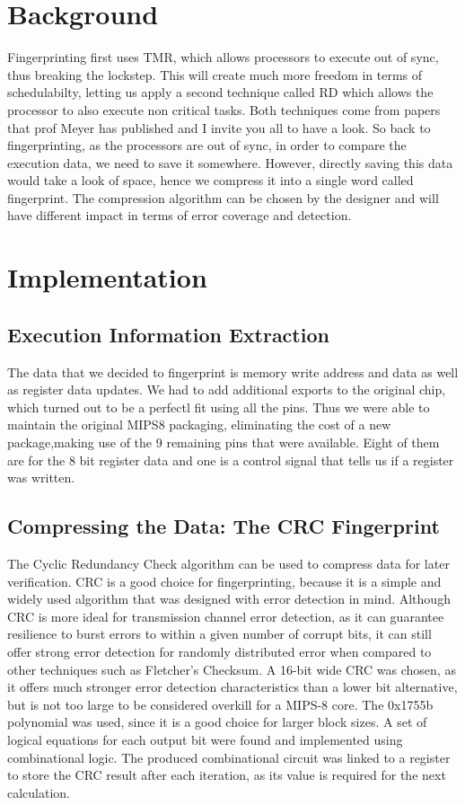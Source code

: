 \documentclass[12pt,journal,compsoc]{IEEEtran}
\begin{document}
\section{Background}
Fingerprinting first uses TMR, which allows processors to execute out of sync, thus breaking the lockstep. This will create much more freedom in terms of schedulabilty, letting us apply a second technique called RD which allows the processor to also execute non critical tasks. Both techniques come from papers that prof Meyer has published and I invite you all to have a look. 
So back to fingerprinting, as the processors are out of sync, in order to compare the execution data, we need to save it somewhere. However, directly saving this data would take a look of space, hence we compress it into a single word called fingerprint. The compression algorithm can be chosen by the designer and will have different impact in terms of error coverage and detection. 

\section{Implementation }
\subsection{Execution Information Extraction}
The data that we decided to fingerprint is memory write address and  data as well as register data updates. We had to add additional exports to the original chip, which turned out to be a perfectl fit using all the pins. Thus we were able to maintain the original MIPS8 packaging, eliminating the cost of a new package,making use of the 9 remaining pins that were available. Eight of them are for the 8 bit register data and one is a control signal that tells us if a register was written. 


\subsection{Compressing the Data: The CRC Fingerprint}

The Cyclic Redundancy Check algorithm can be used to compress data for later verification. CRC is a good choice for fingerprinting, because it is a simple and widely used algorithm that was designed with error detection in mind. Although CRC is more ideal for transmission channel error detection, as it can guarantee resilience to burst errors to within a given number of corrupt bits, it can still offer strong error detection for randomly distributed error when compared to other techniques such as Fletcher's Checksum.
A 16-bit wide CRC was chosen, as it offers much stronger error detection characteristics than a lower bit alternative, but is not too large to be considered overkill for a MIPS-8 core. The 0x1755b polynomial was used, since it is a good choice for larger block sizes\cite{Koopman}. A set of logical equations for each output bit were found\cite{Parcrc} and implemented using combinational logic. The produced combinational circuit was linked to a register to store the CRC result after each iteration, as its value is required for the next calculation. 
\end{document}
